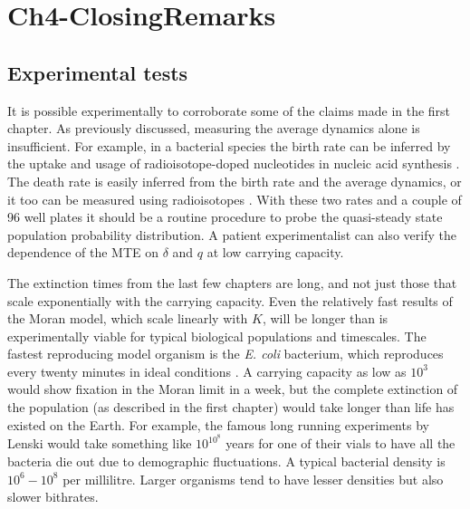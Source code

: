\chapter{Ch4-ClosingRemarks}

\section{Experimental tests}

It is possible experimentally to corroborate some of the claims made in the first chapter. %
As previously discussed, measuring the average dynamics alone is insufficient. 
For example, in a bacterial species the birth rate can be inferred by the uptake and usage of radioisotope-doped nucleotides in nucleic acid synthesis \cite{Kirchman1982}. 
The death rate is easily inferred from the birth rate and the average dynamics, or it too can be measured using radioisotopes \cite{Servais1985}. %
With these two rates and a couple of 96 well plates it should be a routine procedure to probe the quasi-steady state population probability distribution. 
A patient experimentalist can also verify the dependence of the MTE on $\delta$ and $q$ at low carrying capacity. 

The extinction times from the last few chapters are long, and not just those that scale exponentially with the carrying capacity. 
Even the relatively fast results of the Moran model, which scale linearly with $K$, will be longer than is experimentally viable for typical biological populations and timescales. 
The fastest reproducing model organism is the \emph{E. coli} bacterium, which reproduces every twenty minutes in ideal conditions \cite{???}. 
A carrying capacity as low as $10^3$ would show fixation in the Moran limit in a week, but the complete extinction of the population (as described in the first chapter) would take longer than life has existed on the Earth. %
For example, the famous long running experiments by Lenski \cite{???} would take something like $10^{10^8}$ years for one of their vials to have all the bacteria die out due to demographic fluctuations. 
A typical bacterial density is $10^6 - 10^8$ per millilitre. Larger organisms tend to have lesser densities but also slower bithrates. 

